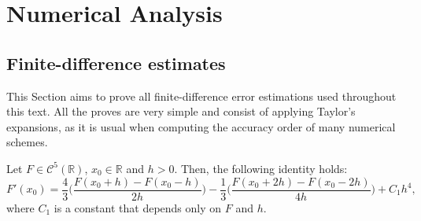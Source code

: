 \chapter{Numerical Analysis}
\label{anexo-na}

\section{Finite-difference estimates}
\label{anexo-fd}
This Section aims to prove all finite-difference error estimations 
used throughout this text.
All the proves are very simple and consist of applying Taylor's expansions,
as it is usual when computing the accuracy order of many numerical schemes.

\begin{lema}
	\label{lemma:fd-ppm-est1}
	Let $F \in \mathcal{C}^{5}(\mathbb{R})$, $x_0 \in \mathbb{R}$ and $h>0$.
	Then, the following identity holds:
	\begin{equation}	
		\label{lemma:fd-ppm-est1-eq0}
		F'(x_0) =  \frac{4}{3} \bigg(\frac{F(x_0+h) - F(x_0-h)}{2h}\bigg)
                      - \frac{1}{3} \bigg(\frac{F(x_0+2h) - F(x_0-2h)}{4h}\bigg)
		      + C_1h^4,
	\end{equation}
	where $C_1$ is a constant that depends only on $F$ and $h$.
\end{lema}

